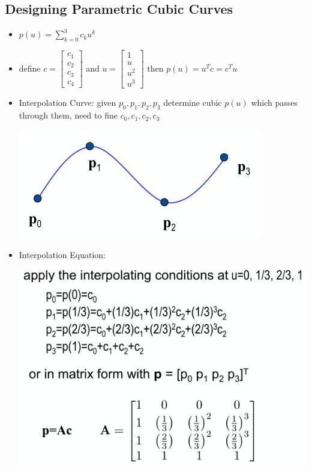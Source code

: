 \documentclass[11pt,a4paper]{article}
\begin{document}
	\subsection{Designing Parametric Cubic Curves}
	\begin{itemize}
		\item $p(u) = \sum_{k=0}^{3} c_{k}u^{k}$
		\item define $c=\begin{bmatrix} c_{1} \\ c_{2} \\ c_{3} \\ c_{4} \end{bmatrix}$ and $u=\begin{bmatrix} 1 \\ u \\ u^{2} \\ u^{3} \end{bmatrix}$ then $p(u) = u^{T}c = c^{T}u$
		\item Interpolation Curve: given $p_{0},p_{1},p_{2},p_{3}$ determine cubic $p(u)$ which passes through them, need to fine $c_{0},c_{1},c_{2},c_{3}$
		\begin{center}
			\includegraphics[scale=0.5]{pictures/interpolatecuve.jpg}
		\end{center}
		\item Interpolation Equation:
		\begin{center}
			\includegraphics[scale=0.5]{pictures/interpolateequation.jpg} \\

\end{center}
\end{itemize}
\end{document}
